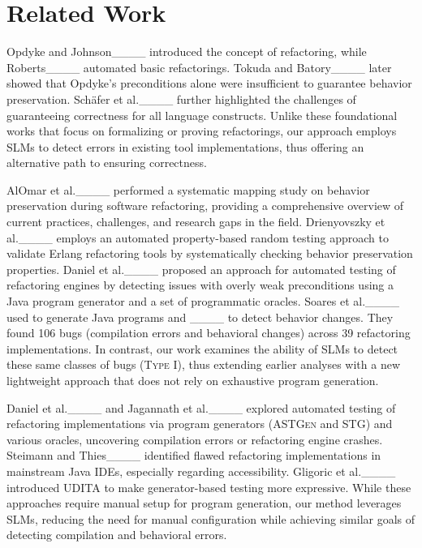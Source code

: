 \section{Related Work}
\label{sec:relwork}

Opdyke and Johnson____ introduced the concept of refactoring, while Roberts____ automated basic refactorings. Tokuda and Batory____ later showed that Opdyke’s preconditions alone were insufficient to guarantee behavior preservation. Sch\"{a}fer et al.____ further highlighted the challenges of guaranteeing correctness for all language constructs. 
Unlike these foundational works that focus on formalizing or proving refactorings, our approach employs SLMs to detect errors in existing tool implementations, thus offering an alternative path to ensuring correctness.

AlOmar et al.____ performed a systematic mapping study on behavior preservation during software refactoring, providing a comprehensive overview of current practices, challenges, and research gaps in the field.
Drienyovszky et al.____ employs an automated property-based random testing approach to validate Erlang refactoring tools by systematically checking behavior preservation properties.
Daniel et al.____ proposed an approach for automated testing of refactoring engines by detecting issues with overly weak preconditions using a Java program generator and a set of programmatic oracles. 
Soares et al.____ used \jdolly{} to generate Java programs and \saferefactor{}____ to detect behavior changes. They found 106 bugs (compilation errors and behavioral changes) across 39 refactoring implementations. 
In contrast, our work examines the ability of SLMs to detect these same classes of bugs (\textsc{Type I}), thus extending earlier analyses with a new lightweight approach that does not rely on exhaustive program generation.

Daniel et al.____ and Jagannath et al.____ explored automated testing of refactoring implementations via program generators (\textsc{ASTGen} and STG) and various oracles, uncovering compilation errors or refactoring engine crashes. Steimann and Thies____ identified flawed refactoring implementations in mainstream Java IDEs, especially regarding accessibility. Gligoric et al.____ introduced \textsc{UDITA} to make generator-based testing more expressive. 
While these approaches require manual setup for program generation, our method leverages SLMs, reducing the need for manual configuration while achieving similar goals of detecting compilation and behavioral errors.

